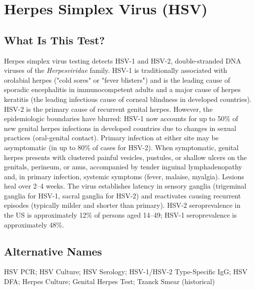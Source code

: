 \chapter{Herpes Simplex Virus (HSV)}

\section*{What Is This Test?}
Herpes simplex virus testing detects HSV-1 and HSV-2, double-stranded DNA viruses of the \textit{Herpesviridae} family. HSV-1 is traditionally associated with orolabial herpes ("cold sores" or "fever blisters") and is the leading cause of sporadic encephalitis in immunocompetent adults and a major cause of herpes keratitis (the leading infectious cause of corneal blindness in developed countries). HSV-2 is the primary cause of recurrent genital herpes. However, the epidemiologic boundaries have blurred: HSV-1 now accounts for up to 50\% of new genital herpes infections in developed countries due to changes in sexual practices (oral-genital contact). Primary infection at either site may be asymptomatic (in up to 80\% of cases for HSV-2). When symptomatic, genital herpes presents with clustered painful vesicles, pustules, or shallow ulcers on the genitals, perineum, or anus, accompanied by tender inguinal lymphadenopathy and, in primary infection, systemic symptoms (fever, malaise, myalgia). Lesions heal over 2--4 weeks. The virus establishes latency in sensory ganglia (trigeminal ganglia for HSV-1, sacral ganglia for HSV-2) and reactivates causing recurrent episodes (typically milder and shorter than primary). HSV-2 seroprevalence in the US is approximately 12\% of persons aged 14--49; HSV-1 seroprevalence is approximately 48\%.

\section*{Alternative Names}
HSV PCR; HSV Culture; HSV Serology; HSV-1/HSV-2 Type-Specific IgG; HSV DFA; Herpes Culture; Genital Herpes Test; Tzanck Smear (historical)

